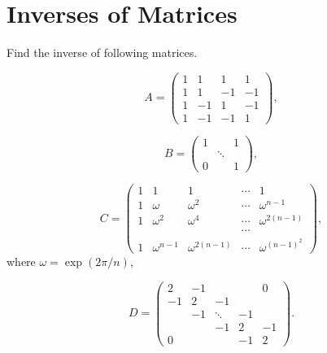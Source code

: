 \section{Inverses of Matrices}
\begin{pro}%
	Find the inverse of following matrices.
	\begin{description}
		\item[(a)]
		\[A=\begin{pmatrix}1&1&1&1\\1&1&-1&-1\\1&-1&1&-1\\1&-1&-1&1\end{pmatrix},\]
		\item[(b)]
		\[B=\begin{pmatrix}1& &1\\ &\ddots& \\0& &1\end{pmatrix},\]
		\item[(c)]
		\[C=\begin{pmatrix}1&1&1&\cdots&1\\1&\omega&\omega^2&\cdots&\omega^{n-1}\\
		1&\omega^2&\omega^4&\cdots&\omega^{2(n-1)}\\& & &\cdots&\\
		1&\omega^{n-1}&\omega^{2(n-1)}&\cdots&\omega^{(n-1)^2}\end{pmatrix},\]
		where $\omega=\exp(2\pi/n)$,
		\item
		\[D=\begin{pmatrix}2&-1& & &0 \\-1&2&-1& &\\ &-1&\ddots&-1& \\
		& &-1&2&-1\\0& & &-1&2\end{pmatrix}.\]
	\end{description}
\end{pro}

